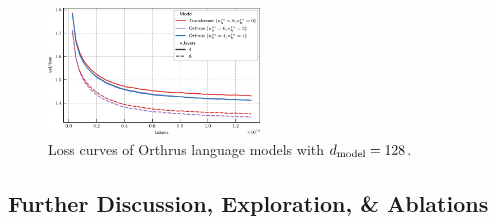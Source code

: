 \begin{figure}
    \centering
    \includegraphics[width=0.5\textwidth]{figs/experiments/tiny_stories/d128L4L6_symattn_asymra.pdf}
    \caption{Loss curves of Orthrus language models with $d_{\mathrm{model}} = 128$.}\label{fig:tiny_stories_val_loss_curves_d128}
\end{figure}

\subsection*{Further Discussion, Exploration, \& Ablations}

